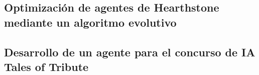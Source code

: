 




\subsection{Optimización de agentes de Hearthstone mediante un algoritmo evolutivo}

\subsection{Desarrollo de un agente para el concurso de IA Tales of Tribute}

